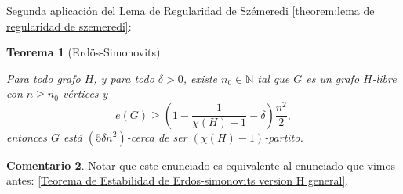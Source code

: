 \documentclass[12pt]{report}
\theoremstyle{plain}
\newtheorem{theorem}{Teorema}[section]
\theoremstyle{definition}
\newtheorem{remark}[theorem]{Comentario}
\newcommand{\naturals}{\mathbb{N}}
\begin{document}
Segunda aplicación del Lema de Regularidad de Szémeredi \ref{theorem:lema de regularidad de szemeredi}:

\begin{theorem}[Erdös-Simonovits]\label{Teorema de Estabilidad de Erdos-simonovits version H general - formulacion 2}

Para todo grafo $H$, y para todo $\delta > 0$, existe $n_0 \in \naturals$ tal que $G$ es un grafo $H$-libre con $n \geq n_0$ vértices y
\[
    e(G) \geq \left ( 1 - \frac 1 {\chi (H) - 1} - \delta \right) \frac{n^2}{2},
\]
entonces $G$ está $(5 \delta n^2)$-cerca de ser $(\chi (H)-1)$-partito.
\end{theorem}

\begin{remark}
Notar que este enunciado es equivalente al enunciado que vimos antes: \ref{Teorema de Estabilidad de Erdos-simonovits version H general}.
\end{remark}
\end{document}
